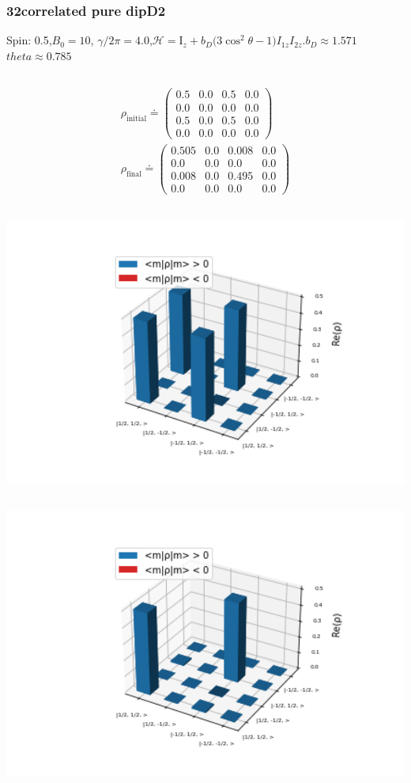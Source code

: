 \documentclass[10pt]{beamer}
\begin{document}
\begin{frame}
\frametitle{32correlated pure dipD2}
Spin: 0.5,$B_0= 10$, $\gamma/2\pi = 4.0$,$\mathcal{H}=\text{I}_{z}+ b_D \big(3\cos^2\theta-1\big)I_{1z}I_{2z}.$$b_D\approx1.571$$theta\approx0.785$
\begin{columns}[T]
\begin{column}{.5\textwidth}
\begin{align*}
\rho_{\text{initial}}\doteq
\begin{pmatrix}
0.5 & 0.0 & 0.5 & 0.0 \\
0.0 & 0.0 & 0.0 & 0.0 \\
0.5 & 0.0 & 0.5 & 0.0 \\
0.0 & 0.0 & 0.0 & 0.0
\end{pmatrix}
\\
\rho_{\text{final}}\doteq
\begin{pmatrix}
0.505 & 0.0 & 0.008 & 0.0 \\
0.0 & 0.0 & 0.0 & 0.0 \\
0.008 & 0.0 & 0.495 & 0.0 \\
0.0 & 0.0 & 0.0 & 0.0
\end{pmatrix}
\end{align*}
\begin{column}{.5\textwidth}
\includegraphics[width=1.5\textwidth]{./spin1-2/32correlated_pure_dipD2/InitialRealPartDensityMatrix.png}
\end{column}
\begin{column}{.5\textwidth}
\includegraphics[width=1.5\textwidth]{./spin1-2/32correlated_pure_dipD2/EvolvedRealPartDensityMatrix.png}

\end{column}
\end{column}
\end{columns}
\end{frame}
\end{document}
